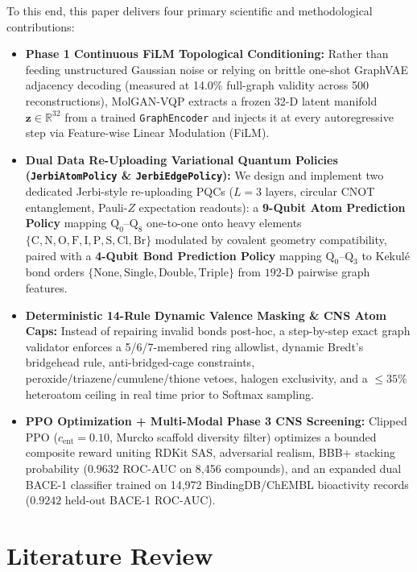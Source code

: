 \documentclass[10pt,a4paper]{article}
\begin{document}
To this end, this paper delivers four primary scientific and methodological contributions:
\begin{itemize}[noitemsep]
    \item \textbf{Phase 1 Continuous FiLM Topological Conditioning:} Rather than feeding unstructured Gaussian noise or relying on brittle one-shot GraphVAE adjacency decoding (measured at 14.0\% full-graph validity across 500 reconstructions), MolGAN-VQP extracts a frozen 32-D latent manifold $\mathbf{z} \in \mathbb{R}^{32}$ from a trained \texttt{GraphEncoder} and injects it at every autoregressive step via Feature-wise Linear Modulation (FiLM).
    \item \textbf{Dual Data Re-Uploading Variational Quantum Policies (\texttt{JerbiAtomPolicy} \& \texttt{JerbiEdgePolicy}):} We design and implement two dedicated Jerbi-style re-uploading PQCs ($L=3$ layers, circular CNOT entanglement, Pauli-$Z$ expectation readouts): a \textbf{9-Qubit Atom Prediction Policy} mapping $\mathrm{Q}_0$--$\mathrm{Q}_8$ one-to-one onto heavy elements $\{\text{C}, \text{N}, \text{O}, \text{F}, \text{I}, \text{P}, \text{S}, \text{Cl}, \text{Br}\}$ modulated by covalent geometry compatibility, paired with a \textbf{4-Qubit Bond Prediction Policy} mapping $\mathrm{Q}_0$--$\mathrm{Q}_3$ to Kekul\'e bond orders $\{\text{None}, \text{Single}, \text{Double}, \text{Triple}\}$ from $192$-D pairwise graph features.
    \item \textbf{Deterministic 14-Rule Dynamic Valence Masking \& CNS Atom Caps:} Instead of repairing invalid bonds post-hoc, a step-by-step exact graph validator enforces a 5/6/7-membered ring allowlist, dynamic Bredt's bridgehead rule, anti-bridged-cage constraints, peroxide/triazene/cumulene/thione vetoes, halogen exclusivity, and a $\le 35\%$ heteroatom ceiling in real time prior to Softmax sampling.
    \item \textbf{PPO Optimization + Multi-Modal Phase 3 CNS Screening:} Clipped PPO ($c_{\text{ent}} = 0.10$, Murcko scaffold diversity filter) optimizes a bounded composite reward uniting RDKit SAS, adversarial realism, BBB+ stacking probability ($0.9632$ ROC-AUC on 8,456 compounds), and an expanded dual BACE-1 classifier trained on 14,972 BindingDB/ChEMBL bioactivity records ($0.9242$ held-out BACE-1 ROC-AUC).
\end{itemize}
\section{Literature Review}
\end{document}
